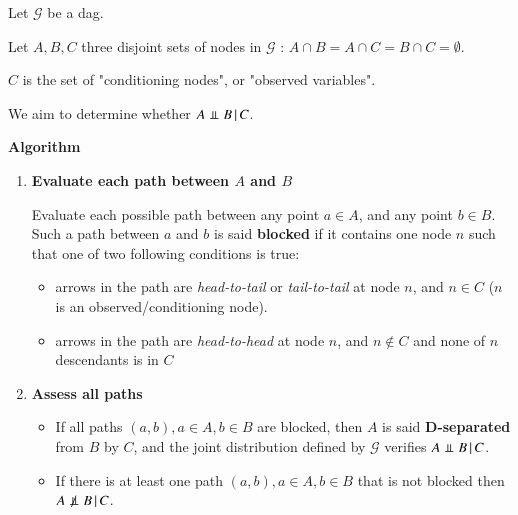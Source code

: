 \begin{tcolorbox}[colback=blue!5!white,colframe=black!75!black,title=D-Separation]
    Let $\mathcal{G}$ be a \gls{dag}.
    
    Let $A, B, C$ three disjoint sets of nodes in $\mathcal{G}$ : $A \cap B = A \cap C = B \cap C = \emptyset$. 
    
    $C$ is the set of "conditioning nodes", or "observed variables".

    We aim to determine whether $A \Perp B \cond C$.

    \textbf{Algorithm}
    \begin{enumerate}
        \item \textbf{Evaluate each path between $A$ and $B$}
        
        Evaluate each possible path between any point $a \in A$, and any point $b \in B$. Such a path between $a$ and $b$ is said \textbf {blocked} if it contains one node $n$ such that one of two following conditions is true:
        
            \begin{itemize}
                \item arrows in the path are \textit{head-to-tail} or \textit{tail-to-tail} at node $n$, and $n \in C$ ($n$ is an observed/conditioning node).
                \item arrows in the path are \textit{head-to-head} at node $n$, and $n \notin C$ and none of $n$ descendants is in $C$
            \end{itemize}
            
        \item \textbf{Assess all paths}
            \begin{itemize}
                \item If all paths $(a,b), a \in A, b \in B$ are blocked, then $A$ is said \textbf{D-separated} from $B$ by $C$, and the joint distribution defined by $\mathcal{G}$ verifies $A \Perp B \cond C$.
                \item If there is at least one path $(a,b), a \in A, b \in B$ that is not blocked then $A \not\Perp B \cond C$.
            \end{itemize}
    \end{enumerate}
\end{tcolorbox}